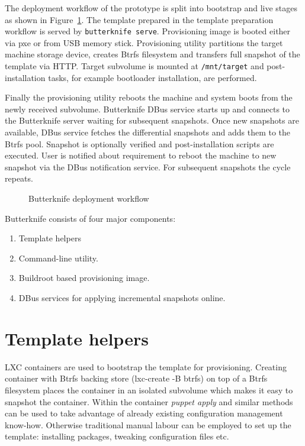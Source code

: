 \documentclass[a4paper,11pt]{kth-mag}
\begin{document}
The deployment workflow of the prototype is split into
bootstrap and live stages as shown in
Figure~\ref{fig:butterknife-workflow}.
The template prepared in the template preparation workflow
is served by \texttt{butterknife serve}.
Provisioning image is booted either via
\gls{pxe} or from USB memory stick.
Provisioning utility
partitions the target machine storage device,
creates Btrfs filesystem and
transfers full snapshot of the template via HTTP.
Target subvolume is mounted at \texttt{/mnt/target}
and post-installation tasks, for example
bootloader installation, are performed.

Finally the provisioning utility reboots the machine
and system boots from the newly received subvolume.
Butterknife DBus service starts up and
connects to the Butterknife server waiting for
subsequent snapshots.
Once new snapshots are available,
DBus service fetches the differential snapshots and
adds them to the Btrfs pool.
Snapshot is optionally verified and post-installation
scripts are executed.
User is notified about requirement to reboot the
machine to new snapshot via the DBus notification service.
For subsequent snapshots the cycle repeats.


\begin{figure}[!htb]
\centering
\scalebox{0.6}{}
\caption{Butterknife deployment workflow}
\label{fig:butterknife-workflow}
\end{figure}



\noindent Butterknife consists of four major components:

\begin{enumerate}
\item Template helpers
\item Command-line utility.
\item Buildroot based provisioning image.
\item DBus services for applying incremental snapshots online.
\end{enumerate}


\clearpage

\section{Template helpers}

LXC containers are used to bootstrap the template for provisioning.
Creating container with Btrfs backing store (lxc-create -B btrfs)
on top of a Btrfs filesystem places the container in an
isolated subvolume which makes it easy to snapshot the container.
Within the container \emph{puppet apply} and similar methods can be used
to take advantage of already existing configuration management know-how.
Otherwise traditional manual labour can be employed
to set up the template: installing packages, tweaking configuration files etc.
\end{document}
